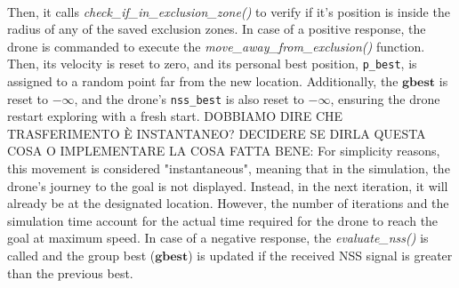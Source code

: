 \noindent\\
Then, it calls \textit{check\_if\_in\_exclusion\_zone()}
to verify if it's position is inside the radius of any of the 
saved exclusion zones.
In case of a positive response, the drone is commanded to 
execute the \textit{move\_away\_from\_exclusion()} function. 
Then, its velocity is reset to zero, and its personal 
best position, \texttt{p\_best}, is assigned to a random point 
far from the new location. Additionally, the $\mathbf{gbest}$ 
is reset to \(-\infty\), and the 
drone's \texttt{nss\_best} is also reset to \(-\infty\), 
ensuring the drone restart exploring with a fresh start.
DOBBIAMO DIRE CHE TRASFERIMENTO È INSTANTANEO?
DECIDERE SE DIRLA QUESTA COSA O IMPLEMENTARE LA COSA FATTA BENE:
For simplicity reasons, this movement is considered "instantaneous", 
meaning that in the simulation, the drone's journey to the goal is 
not displayed. Instead, in the next iteration, it will already 
be at the designated location. However, the number of 
iterations and the simulation time account for the actual 
time required for the drone to reach the goal at maximum speed.
In case of a negative response, the \textit{evaluate\_nss()} is 
called and the group best ($\mathbf{gbest}$) is updated if the received NSS signal 
is greater than the previous best.
\SetAlgoBlockMarkers{}{}
